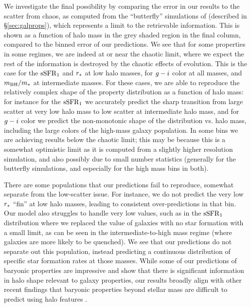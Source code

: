 We investigate the final possibility by comparing the error in our results to the scatter from chaos, as computed from the ``butterfly'' simulations of \cite{Genel2019} (described in \S\ref{sec:galprops}), which represents a limit to the retrievable information.
This is shown as a function of halo mass in the grey shaded region in the final column, compared to the binned error of our predictions.
We see that for some properties in some regimes, we are indeed at or near the chaotic limit, where we expect the rest of the information is destroyed by the chaotic effects of evolution.
This is the case for the $\mathrm{sSFR}_1$ and $r_*$ at low halo masses, for $g-i$ color at all masses, and $m_\mathrm{BH}/m_*$ at intermediate masses.
For these cases, we are able to reproduce the relatively complex shape of the property distribution as a function of halo mass: for instance for the $\mathrm{sSFR}_1$ we accurately predict the sharp transition from large scatter at very low halo mass to low scatter at intermediate halo mass, and for $g-i$ color we predict the non-monotonic shape of the distribution vs. halo mass, including the large colors of the high-mass galaxy population.
In some bins we are achieving results below the chaotic limit; this may be because this is a somewhat optimistic limit as it is computed from a slightly higher resolution simulation, and also possibly due to small number statistics (generally for the butterfly simulations, and especially for the high mass bins in both).

There are some populations that our predictions fail to reproduce, somewhat separate from the low-scatter issue.
For instance, we do not predict the very low $r_*$ ``fin'' at low halo masses, leading to consistent over-predictions in that bin.
Our model also struggles to handle very low values, such as in the $\mathrm{sSFR}_1$ distribution where we replaced the value of galaxies with no star formation with a small limit, as can be seen in the intermediate-to-high mass regime (where galaxies are more likely to be quenched).
We see that our predictions do not separate out this population, instead predicting a continuous distribution of specific star formation rates at those masses.
While some of our predictions of baryonic properties are impressive and show that there is significant information in halo shape relevant to galaxy properties, our results broadly align with other recent findings that baryonic properties beyond stellar mass are difficult to predict using halo features \citep{de_santi_mimicking_2021,stiskalek_scatter_2022}.

